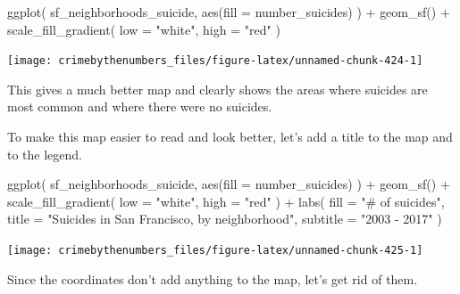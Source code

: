 \documentclass[
]{krantz}
\makeatletter
\newenvironment{Shaded}{\begin{snugshade}}{\end{snugshade}}
\newcommand{\AttributeTok}[1]{\textcolor[rgb]{0.61,0.61,0.61}{#1}}
\newcommand{\FunctionTok}[1]{\textcolor[rgb]{0,0,0}{#1}}
\newcommand{\NormalTok}[1]{#1}
\newcommand{\SpecialCharTok}[1]{\textcolor[rgb]{0,0,0}{#1}}
\newcommand{\StringTok}[1]{\textcolor[rgb]{0.5,0.5,0.5}{#1}}
\newenvironment{kframe}{%
\medskip{}
\setlength{\fboxsep}{.8em}
 \def\at@end@of@kframe{}%
 \ifinner\ifhmode%
  \def\at@end@of@kframe{\end{minipage}}%
  \begin{minipage}{\columnwidth}%
 \fi\fi%
 \def\FrameCommand##1{\hskip\@totalleftmargin \hskip-\fboxsep
 \colorbox{shadecolor}{##1}\hskip-\fboxsep
     \hskip-\linewidth \hskip-\@totalleftmargin \hskip\columnwidth}%
 \MakeFramed {\advance\hsize-\width
   \@totalleftmargin\z@ \linewidth\hsize
   \@setminipage}}%
 {\par\unskip\endMakeFramed%
 \at@end@of@kframe}
\renewenvironment{Shaded}{\begin{kframe}}{\end{kframe}}
\makeatother
\begin{document}
\begin{Shaded}
\begin{Highlighting}[]
\FunctionTok{ggplot}\NormalTok{(}
\NormalTok{  sf\_neighborhoods\_suicide,}
  \FunctionTok{aes}\NormalTok{(}\AttributeTok{fill =}\NormalTok{ number\_suicides)}
\NormalTok{) }\SpecialCharTok{+}
  \FunctionTok{geom\_sf}\NormalTok{() }\SpecialCharTok{+}
  \FunctionTok{scale\_fill\_gradient}\NormalTok{(}
    \AttributeTok{low =} \StringTok{"white"}\NormalTok{,}
    \AttributeTok{high =} \StringTok{"red"}
\NormalTok{  )}
\end{Highlighting}
\end{Shaded}

\begin{center}\texttt{[image: crimebythenumbers\_files/figure-latex/unnamed-chunk-424-1]} \end{center}

This gives a much better map and clearly shows the areas
where suicides are most common and where there were no
suicides.

To make this map easier to read and look better, let's add a
title to the map and to the legend.

\begin{Shaded}
\begin{Highlighting}[]
\FunctionTok{ggplot}\NormalTok{(}
\NormalTok{  sf\_neighborhoods\_suicide,}
  \FunctionTok{aes}\NormalTok{(}\AttributeTok{fill =}\NormalTok{ number\_suicides)}
\NormalTok{) }\SpecialCharTok{+}
  \FunctionTok{geom\_sf}\NormalTok{() }\SpecialCharTok{+}
  \FunctionTok{scale\_fill\_gradient}\NormalTok{(}
    \AttributeTok{low =} \StringTok{"white"}\NormalTok{,}
    \AttributeTok{high =} \StringTok{"red"}
\NormalTok{  ) }\SpecialCharTok{+}
  \FunctionTok{labs}\NormalTok{(}
    \AttributeTok{fill =} \StringTok{"\# of suicides"}\NormalTok{,}
    \AttributeTok{title =} \StringTok{"Suicides in San Francisco, by neighborhood"}\NormalTok{,}
    \AttributeTok{subtitle =} \StringTok{"2003 {-} 2017"}
\NormalTok{  )}
\end{Highlighting}
\end{Shaded}

\begin{center}\texttt{[image: crimebythenumbers\_files/figure-latex/unnamed-chunk-425-1]} \end{center}

Since the coordinates don't add anything to the map, let's
get rid of them.
\end{document}
